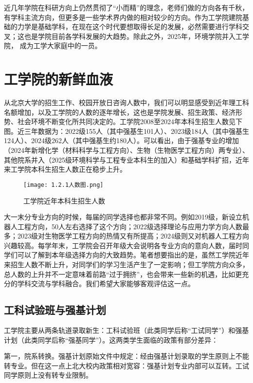 \documentclass[11pt,oneside]{book}
\begin{document}
近几年学院在科研方向上仍然贯彻了“小而精”的理念，老师们做的方向各有千秋，有学科主流方向，但更多是一些学术界内做的相对较少的方向。作为工学院建院基础的力学是基础学科，在现在这个时代要想取得长足的发展，必然需要进行学科交叉；这也是学院目前各学科发展的大趋势。除此之外，2025年，环境学院并入工学院，
成为工学大家庭中的一员。
\section{工学院的新鲜血液}    
从北京大学的招生工作、校园开放日咨询人数中，我们可以明显感受到近年理工科名额增加，以及工学院的人数的逐年增长，这也是学院发展、招生政策、经济形势、社会环境不断变化所共同决定的。工学院2008至2024年本科生招生人数见下图。近三年数据为：2022级155人（其中强基生101人）、2023级184人（其中强基生124人）、2024级262人（其中强基生约180人）。可以看出，由于强基专业的增加（2024年新增化学（材料科学与工程方向）、生物（生物医学工程方向）两专业）、其他院系并入（2025级环境科学与工程专业本科生的加入）和基础学科扩招，近年来工学院本科生招生人数正在稳步上升。

\begin{figure}[htbp]
    \centering
    \texttt{[image: 1.2.1人数图.png]} %
    \renewcommand{\figurename}{图}
    \caption{工学院近年本科生招生人数}
    \label{fig:enter-label}
\end{figure}

        
大一末分专业方向的时候，每届的同学选择也都非常不同。例如2019级，新设立机器人工程方向，50人左右选择了这个方向；2022级选择理论与应用力学方向人数最多；2023级对生物医学工程方向的热情又有所提高；2024级则又对机器人工程方向兴趣较高。每学年末，工学院会召开年级大会说明各专业方向的意向人数，届时同学们可以了解到本年级选择方向的大致趋势。笔者想要指出的是，虽然工学院近年来招生人数不断上升，对同学们的学习生活产生了一定影响；但工学院方向众多，总人数的上升并不一定意味着前路“过于拥挤”，也会带来一些新的机遇，比如更充分的学科交流与学科融合。我们希望大家能够客观评估这一点。
        
\subsection{工科试验班与强基计划}
工学院主要从两条轨道录取新生：工科试验班（此类同学后称“工试同学”）和强基计划（此类同学后称“强基同学”）。这两类学生面临的政策有部分差异：

第一，院系转换。强基计划原始文件中规定：经由强基计划录取的学生原则上不能转专业。但在这一点上北大校内政策相对宽容：强基计划专业内部可以互转。工试同学原则上没有转专业限制。
\end{document}
